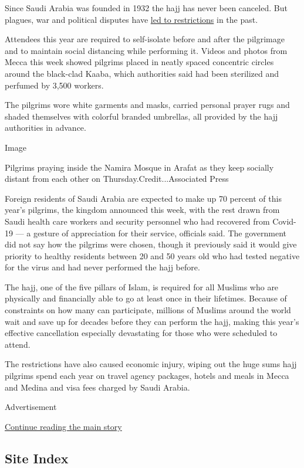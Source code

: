 Since Saudi Arabia was founded in 1932 the hajj has never been canceled.
But plagues, war and political disputes have
\href{https://www.smithsonianmag.com/history/pandemic-isnt-first-time-hajj-has-been-disrupted-muslims-180974735/}{led
to restrictions} in the past.

Attendees this year are required to self-isolate before and after the
pilgrimage and to maintain social distancing while performing it. Videos
and photos from Mecca this week showed pilgrims placed in neatly spaced
concentric circles around the black-clad Kaaba, which authorities said
had been sterilized and perfumed by 3,500 workers.

The pilgrims wore white garments and masks, carried personal prayer rugs
and shaded themselves with colorful branded umbrellas, all provided by
the hajj authorities in advance.

Image

Pilgrims praying inside the Namira Mosque in Arafat as they keep
socially distant from each other on Thursday.Credit...Associated Press

Foreign residents of Saudi Arabia are expected to make up 70 percent of
this year's pilgrims, the kingdom announced this week, with the rest
drawn from Saudi health care workers and security personnel who had
recovered from Covid-19 --- a gesture of appreciation for their service,
officials said. The government did not say how the pilgrims were chosen,
though it previously said it would give priority to healthy residents
between 20 and 50 years old who had tested negative for the virus and
had never performed the hajj before.

The hajj, one of the five pillars of Islam, is required for all Muslims
who are physically and financially able to go at least once in their
lifetimes. Because of constraints on how many can participate, millions
of Muslims around the world wait and save up for decades before they can
perform the hajj, making this year's effective cancellation especially
devastating for those who were scheduled to attend.

The restrictions have also caused economic injury, wiping out the huge
sums hajj pilgrims spend each year on travel agency packages, hotels and
meals in Mecca and Medina and visa fees charged by Saudi Arabia.

Advertisement

\protect\hyperlink{after-bottom}{Continue reading the main story}

\hypertarget{site-index}{%
\subsection{Site Index}\label{site-index}}

